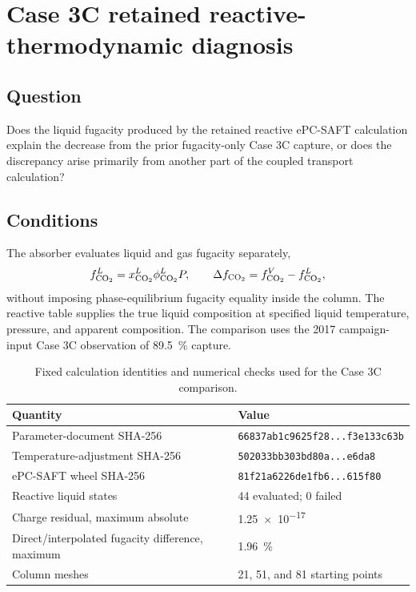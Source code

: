 \section{Case 3C retained reactive-thermodynamic diagnosis}
\label{sec:case3c-retained-reactive-diagnosis}

\subsection*{Question}

Does the liquid  fugacity produced by the retained reactive ePC-SAFT
calculation explain the decrease from the prior fugacity-only Case 3C capture,
or does the discrepancy arise primarily from another part of the coupled
transport calculation?

\subsection*{Conditions}

The absorber evaluates liquid and gas fugacity separately,
\begin{equation}
    f_{\ce{CO2}}^{L}=x_{\ce{CO2}}^{L}\phi_{\ce{CO2}}^{L}P,
    \qquad
    \Delta f_{\ce{CO2}}=f_{\ce{CO2}}^{V}-f_{\ce{CO2}}^{L},
\end{equation}
without imposing phase-equilibrium fugacity equality inside the column.  The
reactive table supplies the true liquid composition at specified liquid
temperature, pressure, and apparent composition.  The comparison uses the
2017 campaign-input Case 3C observation of \SI{89.5}{\percent} capture.

\begin{table}[htbp]
    \centering
    \caption{Fixed calculation identities and numerical checks used for the Case 3C comparison.}
    \label{tab:case3c-identities}
    \begin{threeparttable}
        \small
        \begin{tabularx}{\textwidth}{@{}>{\raggedright\arraybackslash}p{}X@{}}
            \toprule
            Quantity & Value \\
            \midrule
            Parameter-document SHA-256 & \texttt{66837ab1c9625f28...f3e133c63b} \\
            Temperature-adjustment SHA-256 & \texttt{502033bb303bd80a...e6da8} \\
            ePC-SAFT wheel SHA-256 & \texttt{81f21a6226de1fb6...615f80} \\
            Reactive liquid states & 44 evaluated; 0 failed \\
            Charge residual, maximum absolute & \num{1.25e-17} \\
            Direct/interpolated fugacity difference, maximum & \SI{1.96}{\percent} \\
            Column meshes & 21, 51, and 81 starting points \\
            \bottomrule
        \end{tabularx}
    \end{threeparttable}
\end{table}

